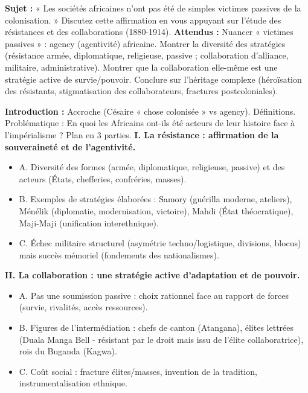 \documentclass[11pt]{article}
\begin{document}
\begin{exercice}
\textbf{Sujet :} « Les sociétés africaines n'ont pas été de simples victimes passives de la colonisation. » Discutez cette affirmation en vous appuyant sur l'étude des résistances et des collaborations (1880-1914).
\textbf{Attendus :} Nuancer « victimes passives » : agency (agentivité) africaine. Montrer la diversité des stratégies (résistance armée, diplomatique, religieuse, passive ; collaboration d'alliance, militaire, administrative). Montrer que la collaboration elle-même est une stratégie active de survie/pouvoir. Conclure sur l'héritage complexe (héroïsation des résistants, stigmatisation des collaborateurs, fractures postcoloniales).
\end{exercice}

\begin{corrige}
\textbf{Introduction :} Accroche (Césaire « chose colonisée » vs agency). Définitions. Problématique : En quoi les Africains ont-ils été acteurs de leur histoire face à l'impérialisme ? Plan en 3 parties.
\textbf{I. La résistance : affirmation de la souveraineté et de l'agentivité.}
\begin{itemize}
    \item A. Diversité des formes (armée, diplomatique, religieuse, passive) et des acteurs (États, chefferies, confréries, masses).
    \item B. Exemples de stratégies élaborées : Samory (guérilla moderne, ateliers), Ménélik (diplomatie, modernisation, victoire), Mahdi (État théocratique), Maji-Maji (unification interethnique).
    \item C. Échec militaire structurel (asymétrie techno/logistique, divisions, blocus) mais succès mémoriel (fondements des nationalismes).
\end{itemize}
\textbf{II. La collaboration : une stratégie active d'adaptation et de pouvoir.}
\begin{itemize}
    \item A. Pas une soumission passive : choix rationnel face au rapport de forces (survie, rivalités, accès ressources).
    \item B. Figures de l'intermédiation : chefs de canton (Atangana), élites lettrées (Duala Manga Bell - résistant par le droit mais issu de l'élite collaboratrice), rois du Buganda (Kagwa).
    \item C. Coût social : fracture élites/masses, invention de la tradition, instrumentalisation ethnique.

\end{itemize}
\end{corrige}
\end{document}

